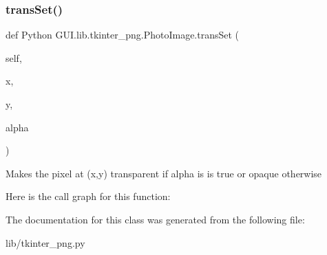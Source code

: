 \subsubsection{\texorpdfstring{trans\+Set()}{transSet()}}
{\footnotesize\ttfamily def Python G\+U\+I.\+lib.\+tkinter\+\_\+png.\+Photo\+Image.\+trans\+Set (\begin{DoxyParamCaption}\item[{}]{self,  }\item[{}]{x,  }\item[{}]{y,  }\item[{}]{alpha }\end{DoxyParamCaption})}

\begin{DoxyVerb}Makes the pixel at (x,y) transparent if alpha is is true or opaque otherwise\end{DoxyVerb}
 Here is the call graph for this function\+:


The documentation for this class was generated from the following file\+:\begin{DoxyCompactItemize}
\item 
lib/tkinter\+\_\+png.\+py\end{DoxyCompactItemize}
